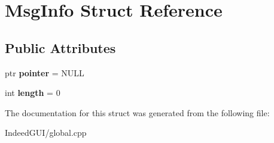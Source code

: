 \hypertarget{struct_msg_info}{}\section{Msg\+Info Struct Reference}
\label{struct_msg_info}
\subsection*{Public Attributes}
\begin{DoxyCompactItemize}
\item 
\hypertarget{struct_msg_info_a7a66029570bf9c166ca8bf459be7f895}{}ptr {\bfseries pointer} = N\+U\+L\+L\label{struct_msg_info_a7a66029570bf9c166ca8bf459be7f895}

\item 
\hypertarget{struct_msg_info_adba673c467d025165b8b433d18844b59}{}int {\bfseries length} = 0\label{struct_msg_info_adba673c467d025165b8b433d18844b59}

\end{DoxyCompactItemize}


The documentation for this struct was generated from the following file\+:\begin{DoxyCompactItemize}
\item 
Indeed\+G\+U\+I/global.\+cpp\end{DoxyCompactItemize}
